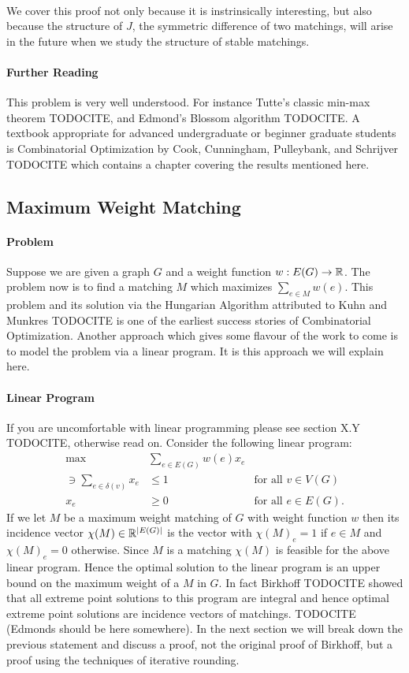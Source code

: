 \paragraph{}
We cover this proof not only because it is instrinsically interesting, but also because the structure of $J$, the symmetric difference of two matchings, will arise in the future when we study the structure of stable matchings.
\paragraph{Further Reading}
This problem is very well understood. For instance Tutte's classic min-max theorem TODOCITE, and Edmond's Blossom algorithm TODOCITE. A textbook appropriate for advanced undergraduate or beginner graduate students is Combinatorial Optimization by Cook, Cunningham, Pulleybank, and Schrijver TODOCITE which contains a chapter covering the results mentioned here.
\subsection{Maximum Weight Matching}
\paragraph{Problem} Suppose we are given a graph $G$ and a weight function $w : E(G) \rightarrow \mathbb{R}$. The problem now is to find a matching $M$ which maximizes $\sum_{e \in M} w(e)$. This problem and its solution via the Hungarian Algorithm attributed to Kuhn and Munkres TODOCITE is one of the earliest success stories of Combinatorial Optimization. Another approach which gives some flavour of the work to come is to model the problem via a linear program. It is this approach we will explain here.
\paragraph{Linear Program}
If you are uncomfortable with linear programming please see section X.Y TODOCITE, otherwise read on. Consider the following linear program:
\begin{align*}
	\text{max} &\sum_{e \in E(G)} w(e) x_e \\
	\ni \sum_{e \in \delta(v)} x_e &\leq 1 &\text{for all $v \in V(G)$} \\
	x_e &\geq 0 &\text{for all $e \in E(G)$.}
\end{align*}
If we let $M$ be a maximum weight matching of $G$ with weight function $w$ then its incidence vector $\chi(M) \in \mathbb{R}^{|E(G)|}$ is the vector with $\chi(M)_e = 1$ if $e \in M$ and $\chi(M)_e = 0$ otherwise. Since $M$ is a matching $\chi(M)$ is feasible for the above linear program. Hence the optimal solution to the linear program is an upper bound on the maximum weight of a $M$ in $G$. In fact Birkhoff TODOCITE showed that all extreme point solutions to this program are integral and hence optimal extreme point solutions are incidence vectors of matchings. TODOCITE (Edmonds should be here somewhere). In the next section we will break down the previous statement and discuss a proof, not the original proof of Birkhoff, but a proof using the techniques of iterative rounding.
